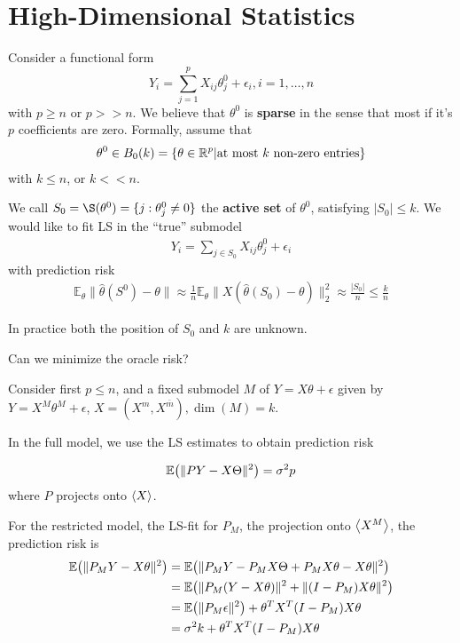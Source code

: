 \chapter{High-Dimensional Statistics}
\label{cha:high-dimens-stat}

Consider a functional form
\begin{equation}
  \label{eq:101}
  Y_{i} = \sum_{j=1}^{p} X_{ij} \theta^{0}_{j} + \epsilon_{i}, i = 1,
  \dots, n
\end{equation}
with $p \geq n$ or $p >> n$.  We believe that $\theta^{0}$ is
\textbf{sparse} in the sense that most if it's $p$ coefficients are
zero.  Formally, assume that
\begin{align}
  \label{eq:102}
  \theta^{0} \in B_{0}(k) = \{ \theta \in \mathbb{R}^{p} | \text{at most $k$
    non-zero entries} \}
\end{align} with $k \leq n$, or $k << n$.

We call $S_{0} = \S(\theta^{0}) = \{ j: \theta_{j}^{0} \neq 0 \}$  the
\textbf{active set} of $\theta^{0}$, satisfying $|S_{0}| \leq k$. We
would like to fit LS in the ``true'' submodel
\begin{align}
  \label{eq:103}
  Y_{i} = \sum_{j \in S_{0}} X_{ij} \theta_{j}^{0} + \epsilon_{i}
\end{align} with prediction risk
\begin{align}
  \label{eq:104}
  \mathbb{E}_{\theta} \| \hat \theta(S^{0})- \theta \| \approx
  \frac{1}{n} \mathbb{E}_{\theta} \| X(\hat \theta(S_{0}) - \theta)
  \|_{2}^{2} \approx \frac{|S_{0}|}{n} \leq \frac{k}{n}
\end{align}

In practice both the position of $S_{0}$ and $k$ are unknown.

\begin{question}
  Can we minimize the oracle risk?
\end{question}

Consider first $p \leq n$, and a fixed submodel $M$ of $Y = X \theta +
\epsilon$ given by $Y = X^{M} \theta^{M} + \epsilon$, $X = (X^{m},
X^{\bar m}), \dim(M) = k$.

In the full model, we use the LS estimates to obtain prediction risk

\begin{align}
  \label{eq:106}
  \E{\|PY - X\Theta \|^{2}} = \sigma^{2}p
\end{align} where $P$ projects onto $\IP{X}$.

For the restricted model, the LS-fit for $P_{M}$, the projection onto
$\IP{X^{M}}$, the prediction risk is
\begin{align}
  \label{eq:107}
  \E{\| P_{M} Y - X \theta \|^{2}} &= \E{\| P_{M} Y - P_{M} X \Theta +
    P_{M} X \theta - X \theta \|^{2}} \\
  &= \E{\|P_{M}(Y - X \theta) \|^{2} + \| (I - P_{M}) X \theta \|^{2}} \\
  &= \E{\| P_{M}\epsilon \|^{2}} + \theta^{T} X^{T} (I - P_{M}) X
  \theta \\
  &= \sigma^{2} k + \theta^{T} X^{T} (I - P_{M}) X \theta
\end{align}

